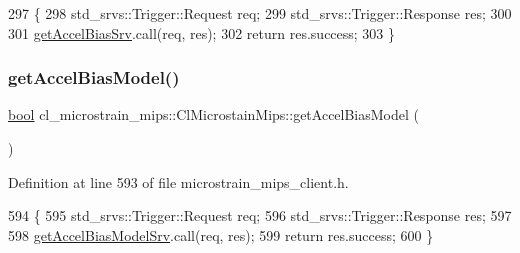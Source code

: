 \begin{DoxyCode}
297     \{
298         std\_srvs::Trigger::Request req;
299         std\_srvs::Trigger::Response res;
300 
301         \hyperlink{classcl__microstrain__mips_1_1ClMicrostainMips_a79547e77f9122ca67610f153657ec8ac}{getAccelBiasSrv}.call(req, res);
302         \textcolor{keywordflow}{return} res.success;
303     \}
\end{DoxyCode}
\mbox{\label{classcl__microstrain__mips_1_1ClMicrostainMips_a8765bf73916e6de2646aba55f3b8a5ce}} 
\subsubsection{\texorpdfstring{get\+Accel\+Bias\+Model()}{getAccelBiasModel()}}
{\footnotesize\ttfamily \hyperlink{classbool}{bool} cl\+\_\+microstrain\+\_\+mips\+::\+Cl\+Microstain\+Mips\+::get\+Accel\+Bias\+Model (\begin{DoxyParamCaption}{ }\end{DoxyParamCaption})\hspace{0.3cm}{\ttfamily [inline]}}



Definition at line 593 of file microstrain\+\_\+mips\+\_\+client.\+h.


\begin{DoxyCode}
594     \{
595         std\_srvs::Trigger::Request req;
596         std\_srvs::Trigger::Response res;
597 
598         \hyperlink{classcl__microstrain__mips_1_1ClMicrostainMips_a5516ee2ad71621f728245d0854104dc7}{getAccelBiasModelSrv}.call(req, res);
599         \textcolor{keywordflow}{return} res.success;
600     \}
\end{DoxyCode}
\mbox{\label{classcl__microstrain__mips_1_1ClMicrostainMips_a6b75108e49aca71fdff9ac7fd83aecc0}} 
